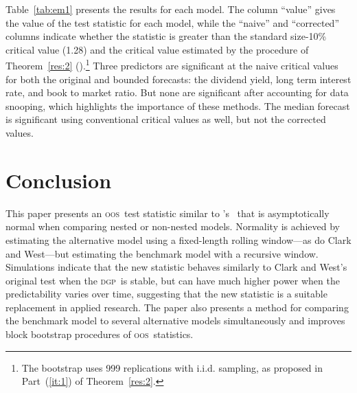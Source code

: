 \documentclass[12pt,fleqn]{article}
\newcommand\poscw{\citeauthor{ClW:06}'s \citeyearpar{ClW:06,ClW:07}}
\theoremstyle{definition}
\newcommand{\dgp}{\textsc{dgp}}
\newcommand{\oos}{\textsc{oos}}
\begin{document}
Table~\ref{tab:em1} presents the results for each model.  The column
``value'' gives the value of the test statistic for each model, while
the ``naive'' and ``corrected'' columns indicate whether the statistic
is greater than the standard size-10\% critical value (1.28) and the
critical value estimated by the procedure of Theorem~\ref{res:2}
(\empiricalcriticalvalue).\footnote{The bootstrap uses 999
  replications with i.i.d. sampling, as proposed in Part~(\ref{it:1})
  of Theorem~\ref{res:2}.}  Three predictors are significant at the
naive critical values for both the original and bounded forecasts: the
dividend yield, long term interest rate, and book to market ratio.
But none are significant after accounting for data snooping, which
highlights the importance of these methods.  The median forecast is
significant using conventional critical values as well, but not the
corrected values.

\begin{table}[tb!]
  \centering
  \empiricaltable
\caption{Results from \oos\ comparison of equity premium prediction
  models; the benchmark is the recursive sample mean of the equity
  premium and each alternative model is a constant and single lag of
  the variable listed in the ``predictor'' column.  The dataset begins
  in 1927 and ends in 2009 and is annual data. The ``value'' column
  lists the value of this paper's \oos\ statistic, the ``naive''
  column indicates whether the statistic is significant at standard
  critical values, and the ``corrected'' column indicates significance
  using the critical values proposed in Theorem~\ref{res:2} that
  account for the number of models.  See Section~\ref{sec:3} for details.}
\label{tab:em1}
\end{table}


\section{Conclusion}\label{sec:4}
This paper presents an \oos\ test statistic similar to \poscw\ that is
asymptotically normal when comparing nested or non-nested models.
Normality is achieved by estimating the alternative model using a
fixed-length rolling window---as do Clark and West---but estimating
the benchmark model with a recursive window.  Simulations indicate
that the new statistic behaves similarly to Clark and West's original
test when the \dgp\ is stable, but can have much higher power when the
predictability varies over time, suggesting that the new statistic is
a suitable replacement in applied research.  The paper also presents a
method for comparing the benchmark model to several alternative models
simultaneously and improves block bootstrap procedures of \oos\
statistics.
\end{document}
